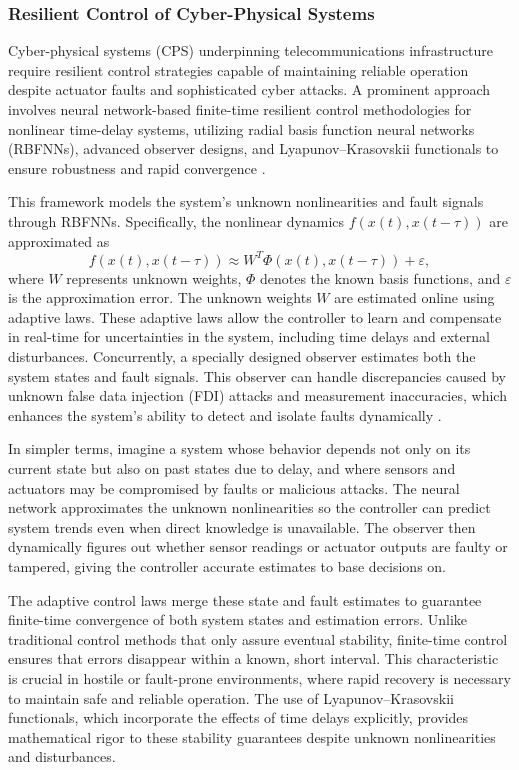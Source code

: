 \documentclass[sigconf]{acmart}
\begin{document}
\subsubsection{Resilient Control of Cyber-Physical Systems}

Cyber-physical systems (CPS) underpinning telecommunications infrastructure require resilient control strategies capable of maintaining reliable operation despite actuator faults and sophisticated cyber attacks. A prominent approach involves neural network-based finite-time resilient control methodologies for nonlinear time-delay systems, utilizing radial basis function neural networks (RBFNNs), advanced observer designs, and Lyapunov--Krasovskii functionals to ensure robustness and rapid convergence \cite{ref46}.

This framework models the system’s unknown nonlinearities and fault signals through RBFNNs. Specifically, the nonlinear dynamics \( f(x(t), x(t-\tau)) \) are approximated as 
\[
f(x(t), x(t-\tau)) \approx W^{T} \Phi(x(t), x(t-\tau)) + \varepsilon,
\] 
where \( W \) represents unknown weights, \( \Phi \) denotes the known basis functions, and \( \varepsilon \) is the approximation error. The unknown weights \( W \) are estimated online using adaptive laws. These adaptive laws allow the controller to learn and compensate in real-time for uncertainties in the system, including time delays and external disturbances. Concurrently, a specially designed observer estimates both the system states and fault signals. This observer can handle discrepancies caused by unknown false data injection (FDI) attacks and measurement inaccuracies, which enhances the system’s ability to detect and isolate faults dynamically \cite{ref46}.

In simpler terms, imagine a system whose behavior depends not only on its current state but also on past states due to delay, and where sensors and actuators may be compromised by faults or malicious attacks. The neural network approximates the unknown nonlinearities so the controller can predict system trends even when direct knowledge is unavailable. The observer then dynamically figures out whether sensor readings or actuator outputs are faulty or tampered, giving the controller accurate estimates to base decisions on.

The adaptive control laws merge these state and fault estimates to guarantee finite-time convergence of both system states and estimation errors. Unlike traditional control methods that only assure eventual stability, finite-time control ensures that errors disappear within a known, short interval. This characteristic is crucial in hostile or fault-prone environments, where rapid recovery is necessary to maintain safe and reliable operation. The use of Lyapunov--Krasovskii functionals, which incorporate the effects of time delays explicitly, provides mathematical rigor to these stability guarantees despite unknown nonlinearities and disturbances.
\end{document}
